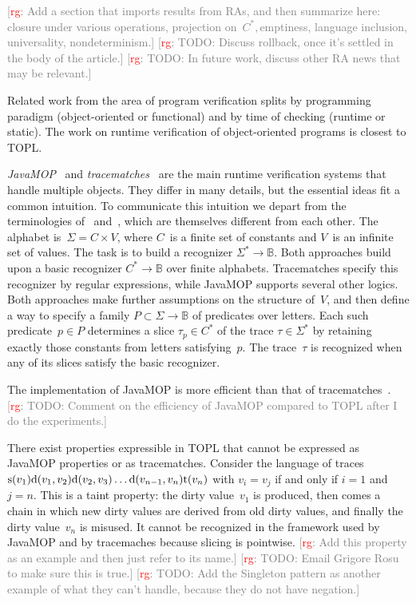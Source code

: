 \documentclass[9pt, preprint]{sigplanconf} %
\newcommand{\noterg}[2]{\textcolor{gray}{[\textcolor{red}{#1}: #2]}}
\newcommand{\rg}[1]{\noterg{rg}{#1}}
\newcommand{\B}{\ensuremath{\mathbb{B}}}
\theoremstyle{definition}
\theoremstyle{remark}
\begin{document}
\rg{Add a section that imports results from RAs, and then summarize here:
closure under various operations, projection on~$C^*, $emptiness, language inclusion, universality, nondeterminism.}
\rg{TODO: Discuss rollback, once it's settled in the body of the article.}
\rg{TODO: In future work, discuss other RA news that may be relevant.}

Related work from the area of program verification splits by programming paradigm (object-oriented or functional) and by time of checking (runtime or static).
The work on runtime verification of object-oriented programs is closest to TOPL\null.

{\it JavaMOP\/}~\cite{dblp:journals/sttt/meredithjgcr12} and {\it tracematches\/}~\cite{dblp:conf/oopsla/allanachklmsst05} are the main runtime verification systems that handle multiple objects.
They differ in many details, but the essential ideas fit a common intuition.
To communicate this intuition we depart from the terminologies of \cite{dblp:journals/sttt/meredithjgcr12}~and~\cite{dblp:conf/oopsla/allanachklmsst05}, which are themselves different from each other.
The alphabet is~$\Sigma=C\times V$, where $C$~is a finite set of constants and $V$~is an infinite set of values.
The task is to build a recognizer $\Sigma^*\to\B$.
Both approaches build upon a basic recognizer $C^*\to\B$ over finite alphabets.
Tracematches specify this recognizer by regular expressions, while JavaMOP supports several other logics.
Both approaches make further assumptions on the structure of~$V$, and then define a way to specify a family $P\subset\Sigma\to\B$ of predicates over letters.
Each such predicate~$p\in P$ determines a slice $\tau_p\in C^*$ of the trace $\tau\in\Sigma^*$ by retaining exactly those constants from letters satisfying~$p$.
The trace~$\tau$ is recognized when any of its slices satisfy the basic recognizer.

The implementation of JavaMOP is more efficient than that of tracematches~\cite{dblp:journals/corr/abs-1112-5761}.
\rg{TODO: Comment on the efficiency of JavaMOP compared to TOPL after I do the experiments.}

There exist properties expressible in TOPL that cannot be expressed as JavaMOP properties or as tracematches.
Consider the language of traces
${\rm s}(v_1) {\rm d}(v_1,v_2){\rm d}(v_2,v_3)\ldots{\rm d}(v_{n-1},v_n){\rm t}(v_n)$
with $v_i=v_j$ if and only if $i=1$ and $j=n$.
This is a taint property: the dirty value~$v_1$ is produced, then comes a chain in which new dirty values are derived from old dirty values, and finally the dirty value~$v_n$ is misused.
It cannot be recognized in the framework used by JavaMOP and by tracemaches because slicing is pointwise.
\rg{Add this property as an example and then just refer to its name.}
\rg{TODO: Email Grigore Rosu to make sure this is true.}
\rg{TODO: Add the Singleton pattern as another example of what they can't handle, because they do not have negation.}
\end{document}
